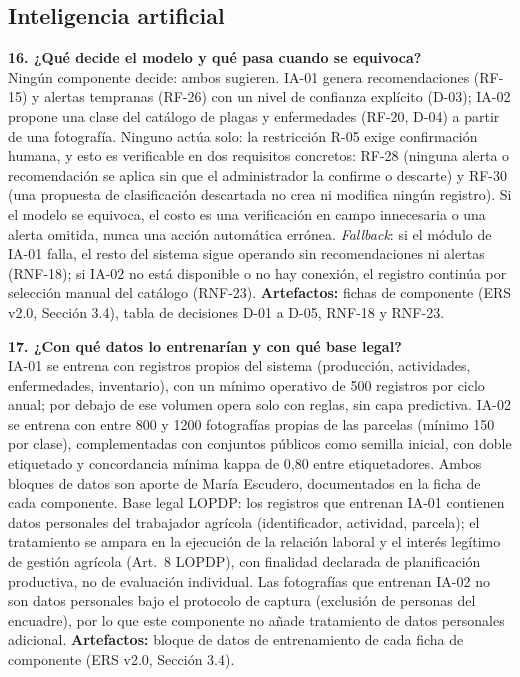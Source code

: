 \subsection*{Inteligencia artificial}

\noindent\textbf{16. ¿Qué decide el modelo y qué pasa cuando se equivoca?}\\
Ningún componente decide: ambos sugieren. IA-01 genera recomendaciones (RF-15) y alertas tempranas (RF-26) con un nivel de confianza explícito (D-03); IA-02 propone una clase del catálogo de plagas y enfermedades (RF-20, D-04) a partir de una fotografía. Ninguno actúa solo: la restricción R-05 exige confirmación humana, y esto es verificable en dos requisitos concretos: RF-28 (ninguna alerta o recomendación se aplica sin que el administrador la confirme o descarte) y RF-30 (una propuesta de clasificación descartada no crea ni modifica ningún registro). Si el modelo se equivoca, el costo es una verificación en campo innecesaria o una alerta omitida, nunca una acción automática errónea. \emph{Fallback}: si el módulo de IA-01 falla, el resto del sistema sigue operando sin recomendaciones ni alertas (RNF-18); si IA-02 no está disponible o no hay conexión, el registro continúa por selección manual del catálogo (RNF-23). \textbf{Artefactos:} fichas de componente (ERS v2.0, Sección 3.4), tabla de decisiones D-01 a D-05, RNF-18 y RNF-23.

\medskip
\noindent\textbf{17. ¿Con qué datos lo entrenarían y con qué base legal?}\\
IA-01 se entrena con registros propios del sistema (producción, actividades, enfermedades, inventario), con un mínimo operativo de 500 registros por ciclo anual; por debajo de ese volumen opera solo con reglas, sin capa predictiva. IA-02 se entrena con entre 800 y 1200 fotografías propias de las parcelas (mínimo 150 por clase), complementadas con conjuntos públicos como semilla inicial, con doble etiquetado y concordancia mínima kappa de 0,80 entre etiquetadores. Ambos bloques de datos son aporte de María Escudero, documentados en la ficha de cada componente. Base legal LOPDP: los registros que entrenan IA-01 contienen datos personales del trabajador agrícola (identificador, actividad, parcela); el tratamiento se ampara en la ejecución de la relación laboral y el interés legítimo de gestión agrícola (Art.~8 LOPDP), con finalidad declarada de planificación productiva, no de evaluación individual. Las fotografías que entrenan IA-02 no son datos personales bajo el protocolo de captura (exclusión de personas del encuadre), por lo que este componente no añade tratamiento de datos personales adicional. \textbf{Artefactos:} bloque de datos de entrenamiento de cada ficha de componente (ERS v2.0, Sección 3.4).


